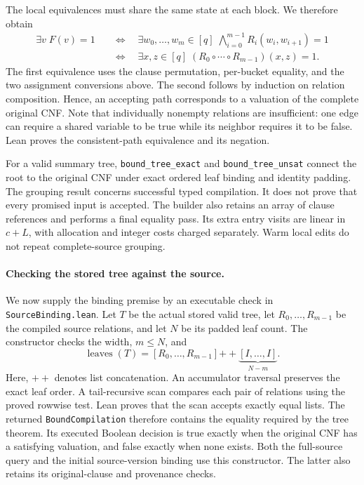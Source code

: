 \documentclass[11pt,a4paper]{article}
\numberwithin{equation}{section}
\theoremstyle{plain}
\theoremstyle{definition}
\theoremstyle{remark}
\begin{document}
The local equivalences must share the same state at each block. We therefore obtain
\[
\begin{aligned}
\exists v\;F(v)=1
&\quad\Longleftrightarrow\quad
\exists w_0,\ldots,w_m\in[q]\;\bigwedge_{i=0}^{m-1}R_i(w_i,w_{i+1})=1\\
&\quad\Longleftrightarrow\quad
\exists x,z\in[q]\;(R_0\circ\cdots\circ R_{m-1})(x,z)=1.
\end{aligned}
\]
The first equivalence uses the clause permutation, per-bucket equality, and the two assignment conversions above. The second follows by induction on relation composition. Hence, an accepting path corresponds to a valuation of the complete original CNF. Note that individually nonempty relations are insufficient: one edge can require a shared variable to be true while its neighbor requires it to be false. Lean proves the consistent-path equivalence and its negation.

For a valid summary tree, \texttt{bound\_tree\_exact} and \texttt{bound\_tree\_unsat} connect the root to the original CNF under exact ordered leaf binding and identity padding. The grouping result concerns successful typed compilation. It does not prove that every promised input is accepted. The builder also retains an array of clause references and performs a final equality pass. Its extra entry visits are linear in $c+L$, with allocation and integer costs charged separately. Warm local edits do not repeat complete-source grouping.

\paragraph{Checking the stored tree against the source.}
We now supply the binding premise by an executable check in \texttt{SourceBinding.lean}. Let $T$ be the actual stored valid tree, let $R_0,\ldots,R_{m-1}$ be the compiled source relations, and let $N$ be its padded leaf count. The constructor checks the width, $m\leq N$, and
\[
\operatorname{leaves}(T)
=[R_0,\ldots,R_{m-1}]\mathbin{+\!+}
\underbrace{[I,\ldots,I]}_{N-m}.
\]
Here, $+\!+$ denotes list concatenation. An accumulator traversal preserves the exact leaf order. A tail-recursive scan compares each pair of relations using the proved rowwise test. Lean proves that the scan accepts exactly equal lists. The returned \texttt{BoundCompilation} therefore contains the equality required by the tree theorem. Its executed Boolean decision is true exactly when the original CNF has a satisfying valuation, and false exactly when none exists. Both the full-source query and the initial source-version binding use this constructor. The latter also retains its original-clause and provenance checks.
\end{document}
